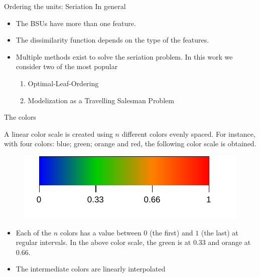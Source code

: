 \documentclass[10pt]{beamer}
\begin{document}
\begin{frame}{Ordering the units: Seriation}
    In general
    \begin{itemize}
        \item The BSUs have more than one feature.
        \item The dissimilarity function depends on the type of the features.
        \item Multiple methods exist to solve the seriation problem. In this work we consider two of the most popular
            \begin{enumerate}
                \item Optimal-Leaf-Ordering 
                \item Modelization as a Travelling Salesman Problem 
            \end{enumerate}
    \end{itemize}

\end{frame}

\begin{frame}{The colors}

    A linear color scale is created using $n$ different colors evenly spaced.
    For instance, with four colors: blue; green; orange  and red, the following color scale is obtained.

    \begin{figure}
        \centering
        \includegraphics{figures/colorscale.pdf}
    \end{figure}

    \begin{itemize}
        \item Each of the $n$ colors has a value between $0$ (the first) and $1$ (the last) at regular intervals. In the above color scale, the green is at $0.33$ and orange at $0.66$.
        \item The intermediate colors are linearly interpolated
    \end{itemize}
\end{frame}
\end{document}

